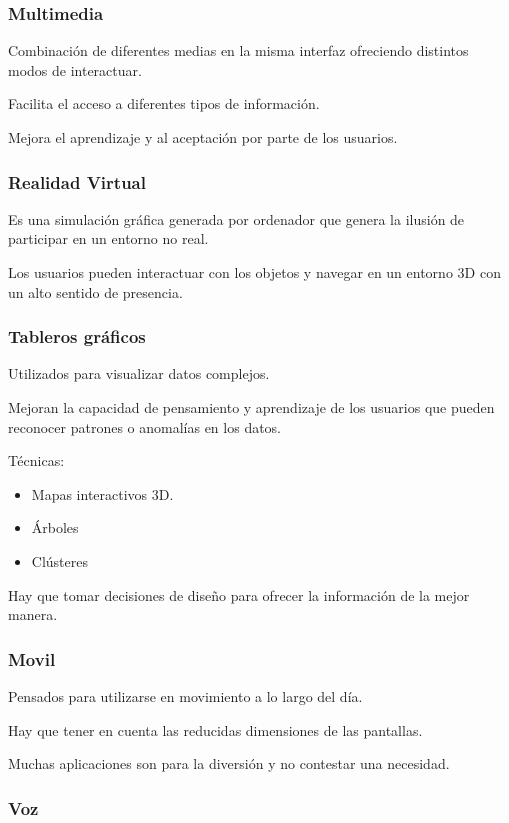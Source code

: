\documentclass[12pt, twoside, openright]{report} %
\begin{document}
\subsubsection{Multimedia}

Combinación de diferentes medias en la misma interfaz ofreciendo
distintos modos de interactuar.

Facilita el acceso a diferentes tipos de información.

Mejora el aprendizaje y al aceptación por parte de los usuarios.

\subsubsection{Realidad Virtual}



Es una simulación gráfica generada por ordenador que genera la
ilusión de participar en un entorno no real.

Los usuarios pueden interactuar con los objetos y navegar en un
entorno 3D con un alto sentido de presencia.
\subsubsection{Tableros gráficos}

Utilizados para visualizar datos complejos.

Mejoran la capacidad de pensamiento y aprendizaje de los
usuarios que pueden reconocer patrones o anomalías en los datos.

Técnicas:

\begin{itemize}
	\item Mapas interactivos 3D.
	\item Árboles
	\item Clústeres
\end{itemize}

Hay que tomar decisiones de diseño para ofrecer la información
de la mejor manera.

\subsubsection{Movil}
Pensados para utilizarse en movimiento a lo largo del día.

Hay que tener en cuenta las reducidas dimensiones de las
pantallas.

Muchas aplicaciones son para la diversión y no contestar una
necesidad.

\subsubsection{Voz}
\end{document}
